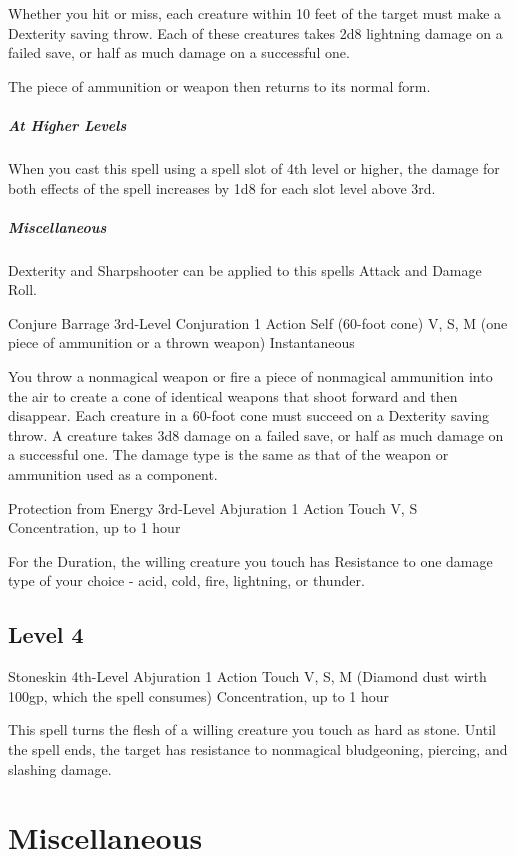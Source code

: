 \documentclass[letterpaper,openany,oneside,twocolumn]{book}
\begin{document}
Whether you hit or miss, each creature within 10 feet of the target must make a Dexterity saving throw. Each of these creatures takes 2d8 lightning damage on a failed save, or half as much damage on a successful one.

The piece of ammunition or weapon then returns to its normal form. 

\subparagraph*{At Higher Levels} When you cast this spell using a spell slot of 4th level or higher, the damage for both effects of the spell increases by 1d8 for each slot level above 3rd.

\subparagraph*{Miscellaneous} Dexterity and Sharpshooter can be applied to this spells Attack and Damage Roll.

\DndSpellHeader
  {Conjure Barrage}
  {3rd-Level Conjuration}
  {1 Action}
  {Self (60-foot cone)}
  {V, S, M (one piece of ammunition or a thrown weapon)}
  {Instantaneous}

You throw a nonmagical weapon or fire a piece of nonmagical ammunition into the air to create a cone of identical weapons that shoot forward and then disappear. Each creature in a 60-foot cone must succeed on a Dexterity saving throw. A creature takes 3d8 damage on a failed save, or half as much damage on a successful one. The damage type is the same as that of the weapon or ammunition used as a component.

\DndSpellHeader
  {Protection from Energy}
  {3rd-Level Abjuration}
  {1 Action}
  {Touch}
  {V, S}
  {Concentration, up to 1 hour}
  
For the Duration, the willing creature you touch has Resistance to one damage type of your choice - acid, cold, fire, lightning, or thunder.

\subsection*{Level 4}

\DndSpellHeader
  {Stoneskin}
  {4th-Level Abjuration}
  {1 Action}
  {Touch}
  {V, S, M (Diamond dust wirth 100gp, which the spell consumes)}
  {Concentration, up to 1 hour}
  
This spell turns the flesh of a willing creature you touch as hard as stone. Until the spell ends, the target has resistance to nonmagical bludgeoning, piercing, and slashing damage.

\section*{Miscellaneous}
\end{document}

